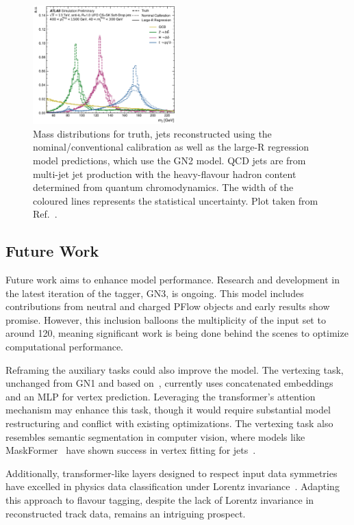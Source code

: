 \begin{figure}
    \centering
    \includegraphics[width=0.49\textwidth]{figures/flavour_tagging/fig_10.pdf}
    \caption{Mass distributions for truth, jets reconstructed using the nominal/conventional calibration as well as the large-R regression model predictions, which use the GN2 model. QCD jets are from multi-jet jet production with the heavy-flavour hadron content determined from quantum chromodynamics. The width of the coloured lines represents the statistical uncertainty. Plot taken from Ref.~\cite{GN2Calib}.}
    \label{fig:gn2calib}
\end{figure}

\subsection{Future Work}

Future work aims to enhance model performance.
Research and development in the latest iteration of the tagger, GN3, is ongoing.
This model includes contributions from neutral and charged PFlow objects and early results show promise.
However, this inclusion balloons the multiplicity of the input set to around 120, meaning significant work is being done behind the scenes to optimize computational performance.

Reframing the auxiliary tasks could also improve the model.
The vertexing task, unchanged from GN1 and based on~\textcite{SecondaryVertexFinding}, currently uses concatenated embeddings and an MLP for vertex prediction.
Leveraging the transformer's attention mechanism may enhance this task, though it would require substantial model restructuring and conflict with existing optimizations.
The vertexing task also resembles semantic segmentation in computer vision, where models like MaskFormer~\cite{MaskFormer} have shown success in vertex fitting for jets~\cite{MaskFormerJets}.

Additionally, transformer-like layers designed to respect input data symmetries~\cite{GeometricAlgebraTransformer} have excelled in physics data classification under Lorentz invariance~\cite{LorentzEquivariantGeometricAlgebra}.
Adapting this approach to flavour tagging, despite the lack of Lorentz invariance in reconstructed track data, remains an intriguing prospect.
